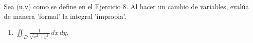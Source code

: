 Sea (u,v) como se define en el Ejercicio 8. Al hacer un cambio de variables, evalúa de manera 'formal' la integral 'impropia'.
\begin{enumerate}[label=(\alph*), itemsep=0.4em, topsep=0.5em]
	\item $\displaystyle \iint_D \frac{1}{\sqrt{x^2 + y^2}} \, dx \, dy,$
\end{enumerate}
